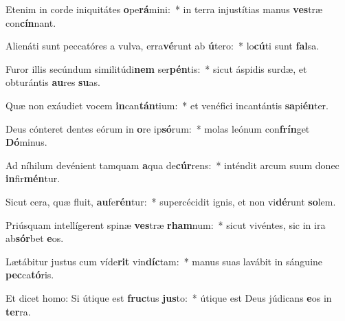\item Etenim in corde iniquitátes \textbf{o}pe\textbf{rá}mini:~* in terra injustítias manus \textbf{ves}træ con\textbf{cín}nant.
\item Alienáti sunt peccatóres a vulva, erra\textbf{vé}runt ab \textbf{ú}tero:~* lo\textbf{cú}ti sunt \textbf{fal}sa.
\item Furor illis secúndum similitúdi\textbf{nem} ser\textbf{pén}tis:~* sicut áspidis surdæ, et obturántis \textbf{au}res \textbf{su}as.
\item Quæ non exáudiet vocem \textbf{in}can\textbf{tán}tium:~* et venéfici incantántis \textbf{sa}pi\textbf{én}ter.
\item Deus cónteret dentes eórum in \textbf{o}re ip\textbf{só}rum:~* molas leónum con\textbf{frín}get \textbf{Dó}minus.
\item Ad níhilum devénient tamquam \textbf{a}qua de\textbf{cúr}rens:~* inténdit arcum suum donec \textbf{in}fir\textbf{mén}tur.
\item Sicut cera, quæ fluit, \textbf{au}fe\textbf{rén}tur:~* supercécidit ignis, et non vi\textbf{dé}runt \textbf{so}lem.
\item Priúsquam intellígerent spinæ \textbf{ves}træ \textbf{rham}num:~* sicut vivéntes, sic in ira ab\textbf{sór}bet \textbf{e}os.
\item Lætábitur justus cum víde\textbf{rit} vin\textbf{díc}tam:~* manus suas lavábit in sánguine \textbf{pec}ca\textbf{tó}ris.
\item Et dicet homo: Si útique est \textbf{fruc}tus \textbf{jus}to:~* útique est Deus júdicans \textbf{e}os in \textbf{ter}ra.
